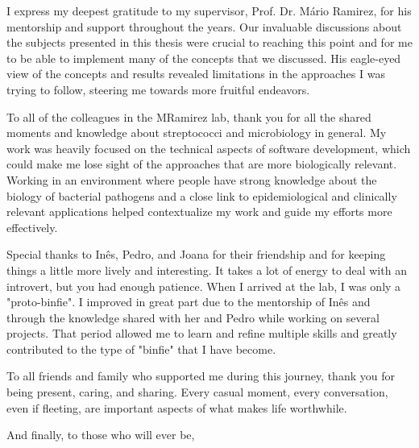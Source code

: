 


I express my deepest gratitude to my supervisor, Prof. Dr. Mário Ramirez, for his mentorship and support throughout the years. Our invaluable discussions about the subjects presented in this thesis were crucial to reaching this point and for me to be able to implement many of the concepts that we discussed. His eagle-eyed view of the concepts and results revealed limitations in the approaches I was trying to follow, steering me towards more fruitful endeavors.

To all of the colleagues in the MRamirez lab, thank you for all the shared moments and knowledge about streptococci and microbiology in general. My work was heavily focused on the technical aspects of software development, which could make me lose sight of the approaches that are more biologically relevant. Working in an environment where people have strong knowledge about the biology of bacterial pathogens and a close link to epidemiological and clinically relevant applications helped contextualize my work and guide my efforts more effectively.

Special thanks to Inês, Pedro, and Joana for their friendship and for keeping things a little more lively and interesting. It takes a lot of energy to deal with an introvert, but you had enough patience. When I arrived at the lab, I was only a "proto-binfie". I improved in great part due to the mentorship of Inês and through the knowledge shared with her and Pedro while working on several projects. That period allowed me to learn and refine multiple skills and greatly contributed to the type of "binfie" that I have become.

To all friends and family who supported me during this journey, thank you for being present, caring, and sharing. Every casual moment, every conversation, even if fleeting, are important aspects of what makes life worthwhile.




And finally, to those who will ever be,

